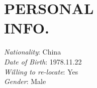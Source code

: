 
\section{PERSONAL\\INFO.}

{\em Nationality}: China\\
{\em Date of Birth}: 1978.11.22\\
{\em Willing to re-locate}: Yes \\
{\em Gender}: Male

